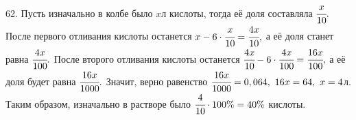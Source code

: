 62. Пусть изначально в колбе было $x$л кислоты, тогда её доля составляла $\cfrac{x}{10}.$ После первого отливания кислоты останется $x-6\cdot\cfrac{x}{10}=\cfrac{4x}{10},$ а её доля станет равна $\cfrac{4x}{100}.$ После второго отливания кислоты останется $\cfrac{4x}{10}-6\cdot\cfrac{4x}{100}=\cfrac{16x}{100},$ а её доля будет равна $\cfrac{16x}{1000}.$ Значит, верно равенство $\cfrac{16x}{1000}=0,064,\ 16x=64,\ x=4$л. Таким образом, изначально в растворе было $\cfrac{4}{10}\cdot100\%=40\%$ кислоты.
\newpage
